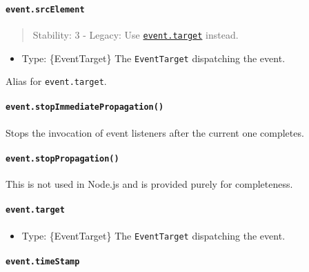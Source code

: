 \paragraph{\texorpdfstring{\texttt{event.srcElement}}{event.srcElement}}\label{event.srcelement}

\begin{quote}
Stability: 3 - Legacy: Use \hyperref[eventtarget]{\texttt{event.target}}
instead.
\end{quote}

\begin{itemize}
\tightlist
\item
  Type: \{EventTarget\} The \texttt{EventTarget} dispatching the event.
\end{itemize}

Alias for \texttt{event.target}.

\paragraph{\texorpdfstring{\texttt{event.stopImmediatePropagation()}}{event.stopImmediatePropagation()}}\label{event.stopimmediatepropagation}

Stops the invocation of event listeners after the current one completes.

\paragraph{\texorpdfstring{\texttt{event.stopPropagation()}}{event.stopPropagation()}}\label{event.stoppropagation}

This is not used in Node.js and is provided purely for completeness.

\paragraph{\texorpdfstring{\texttt{event.target}}{event.target}}\label{event.target}

\begin{itemize}
\tightlist
\item
  Type: \{EventTarget\} The \texttt{EventTarget} dispatching the event.
\end{itemize}

\paragraph{\texorpdfstring{\texttt{event.timeStamp}}{event.timeStamp}}\label{event.timestamp}

